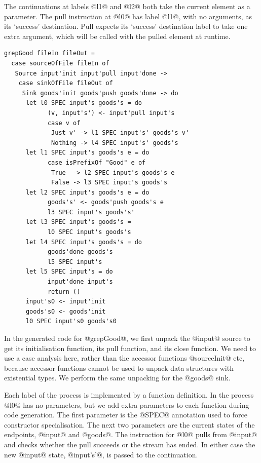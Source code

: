 The continuations at labels @l1@ and @l2@ both take the current element as a parameter.
The pull instruction at @l0@ has label @l1@, with no arguments, as its `success' destination.
Pull expects its `success' destination label to take one extra argument, which will be called with the pulled element at runtime.

\begin{lstlisting}
grepGood fileIn fileOut =
  case sourceOfFile fileIn of
   Source input'init input'pull input'done ->
    case sinkOfFile fileOut of
     Sink goods'init goods'push goods'done -> do
      let l0 SPEC input's goods's = do
            (v, input's') <- input'pull input's
            case v of
             Just v' -> l1 SPEC input's' goods's v'
             Nothing -> l4 SPEC input's' goods's
      let l1 SPEC input's goods's e = do
            case isPrefixOf "Good" e of
             True  -> l2 SPEC input's goods's e
             False -> l3 SPEC input's goods's
      let l2 SPEC input's goods's e = do
            goods's' <- goods'push goods's e
            l3 SPEC input's goods's'
      let l3 SPEC input's goods's =
            l0 SPEC input's goods's
      let l4 SPEC input's goods's = do
            goods'done goods's
            l5 SPEC input's
      let l5 SPEC input's = do
            input'done input's
            return ()
      input's0 <- input'init
      goods's0 <- goods'init
      l0 SPEC input's0 goods's0
\end{lstlisting}

In the generated code for @grepGood@, we first unpack the @input@ source to get its initialisation function, its pull function, and its close function.
We need to use a case analysis here, rather than the accessor functions @sourceInit@ etc, because accessor functions cannot be used to unpack data structures with existential types.
We perform the same unpacking for the @goods@ sink.

Each label of the process is implemented by a function definition.
In the process @l0@ has no parameters, but we add extra parameters to each function during code generation.
The first parameter is the @SPEC@ annotation used to force constructor specialisation.
The next two parameters are the current states of the endpoints, @input@ and @goods@.
The instruction for @l0@ pulls from @input@ and checks whether the pull succeeds or the stream has ended.
In either case the new @input@ state, @input's'@, is passed to the continuation.


